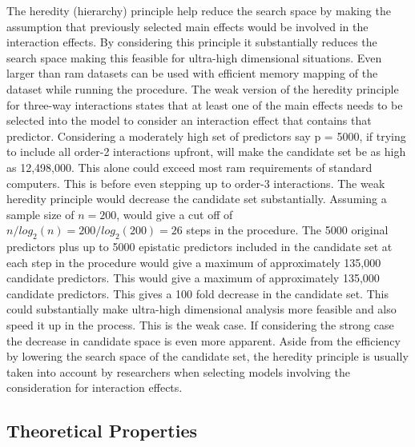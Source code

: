 \documentclass[11pt,]{book}
\theoremstyle{definition}
\theoremstyle{definition}
\theoremstyle{remark}
\begin{document}
The heredity (hierarchy) principle help reduce the search space by
making the assumption that previously selected main effects would be
involved in the interaction effects. By considering this principle it
substantially reduces the search space making this feasible for
ultra-high dimensional situations. Even larger than ram datasets can be
used with efficient memory mapping of the dataset while running the
procedure. The weak version of the heredity principle for three-way
interactions states that at least one of the main effects needs to be
selected into the model to consider an interaction effect that contains
that predictor. Considering a moderately high set of predictors say p =
5000, if trying to include all order-2 interactions upfront, will make
the candidate set be as high as 12,498,000. This alone could exceed most
ram requirements of standard computers. This is before even stepping up
to order-3 interactions. The weak heredity principle would decrease the
candidate set substantially. Assuming a sample size of \(n = 200\),
would give a cut off of \(n/log_{2}(n) = 200/log_{2}(200) = 26\) steps
in the procedure. The 5000 original predictors plus up to 5000 epistatic
predictors included in the candidate set at each step in the procedure
would give a maximum of approximately 135,000 candidate predictors. This
would give a maximum of approximately 135,000 candidate predictors. This
gives a 100 fold decrease in the candidate set. This could substantially
make ultra-high dimensional analysis more feasible and also speed it up
in the process. This is the weak case. If considering the strong case
the decrease in candidate space is even more apparent. Aside from the
efficiency by lowering the search space of the candidate set, the
heredity principle is usually taken into account by researchers when
selecting models involving the consideration for interaction effects.

\subsection{Theoretical Properties}\label{theoretical-properties}
\end{document}
